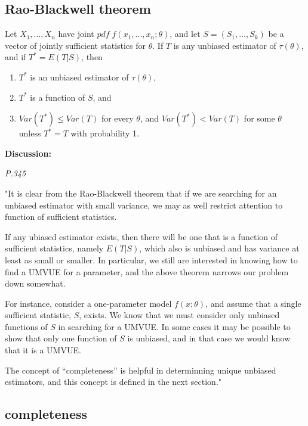 \documentclass[]{book}
\begin{document}
\hypertarget{rao-blackwell-theorem}{%
\subsection{Rao-Blackwell theorem}\label{rao-blackwell-theorem}}

Let \(X_1,...,X_n\) have joint \(pdf \; f(x_1,...,x_n; \theta)\), and let \(S=(S_1,...,S_k)\) be a vector of jointly sufficient statistics for \(\theta\). If \(T\) is any unbiased estimator of \(\tau(\theta)\), and if \(T^*=E(T|S)\), then

\begin{enumerate}
\def\labelenumi{(\arabic{enumi})}
\item
  \(T^*\) is an unbiased estimator of \(\tau(\theta)\),
\item
  \(T^*\) is a function of \(S\), and
\item
  \(Var(T^*) \leq Var(T)\) for every \(\theta\), and \(Var(T^*) < Var(T)\) for some \(\theta\) unless \(T^*=T\) with probability 1.
\end{enumerate}

\textbf{Discussion:}

\emph{P.345}

"It is clear from the Rao-Blackwell theorem that if we are searching for an unbiased estimator with small variance, we may as well restrict attention to function of sufficient statistics.

If any ubiased estimator exists, then there will be one that is a function of sufficient statistics, namely \(E(T|S)\), which also is unbiased and has variance at least as small or smaller. In particular, we still are interested in knowing how to find a UMVUE for a parameter, and the above theorem narrows our problem down somewhat.

For instance, consider a one-parameter model \(f(x;\theta)\), and assume that a single sufficient statistic, \(S\), exists. We know that we must consider only unbiased functions of \(S\) in searching for a UMVUE. In some cases it may be possible to show that only one function of \(S\) is unbiased, and in that case we would know that it is a UMVUE.

The concept of ``completeness'' is helpful in determinning unique unbiased estimators, and this concept is defined in the next section."

\hypertarget{completeness}{%
\subsection{completeness}\label{completeness}}
\end{document}

